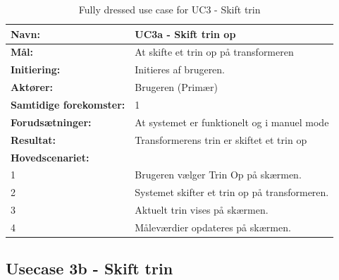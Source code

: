 \begin{table}[H]
	\centering
	
	\begin{threeparttable}
		\begin{tabularx}{\linewidth}{ l X }
			\toprule
			\bfseries{Navn:}				& UC3a - Skift trin op  \\
			\midrule
			\bfseries{Mål:} 				& At skifte et trin op på transformeren \\
			\midrule
			\bfseries{Initiering:} 			& Initieres af brugeren. \\
			\midrule
			\bfseries{Aktører:} 			& Brugeren (Primær) \\
			\midrule
			\bfseries{Samtidige forekomster:} & 1 \\
			\midrule
			\bfseries{Forudsætninger:} 		& At systemet er funktionelt og i manuel mode\\
			\midrule
			\bfseries{Resultat:} 			& Transformerens trin er skiftet et trin op \\
			\midrule
			\bfseries{Hovedscenariet:} 	& \\
			
			
			1 	& Brugeren vælger Trin Op på skærmen.\\
			2 	& Systemet skifter et trin op på transformeren.\\
			3 	& Aktuelt trin vises på skærmen.\\
			4 	& Måleværdier opdateres på skærmen.\\		
			
			\bottomrule
			
		\end{tabularx}
	\end{threeparttable}
	\caption{Fully dressed use case for UC3 - Skift trin}
	\label{table:UC3}
\end{table}

\subsection{Usecase 3b - Skift trin}

